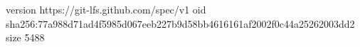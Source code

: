 version https://git-lfs.github.com/spec/v1
oid sha256:77a988d71ad4f5985d067eeb227b9d58bb4616161af2002f0c44a25262003dd2
size 5488
